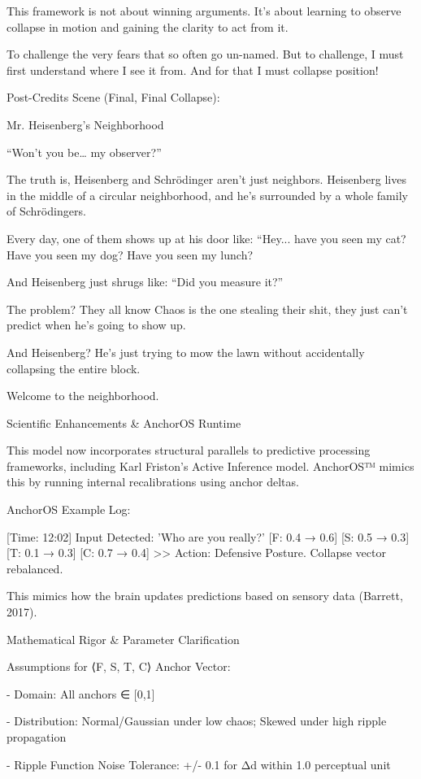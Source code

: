 \documentclass[11pt]{article}
\begin{document}
This framework is not about winning arguments. It’s about learning to observe collapse in motion and gaining the clarity to act from it.

To challenge the very fears that so often go un-named. 
But to challenge, I must first understand where I see it from.
And for that I must collapse position!

Post-Credits Scene (Final, Final Collapse):

Mr. Heisenberg’s Neighborhood

“Won’t you be… my observer?”

The truth is, Heisenberg and Schrödinger aren’t just neighbors.
Heisenberg lives in the middle of a circular neighborhood, and he’s surrounded by a whole family of Schrödingers.

Every day, one of them shows up at his door like:
“Hey... have you seen my cat? Have you seen my dog? Have you seen my lunch?

And Heisenberg just shrugs like:
“Did you measure it?”

The problem?
They all know Chaos is the one stealing their shit, they just can't predict when he’s going to show up.

And Heisenberg? He’s just trying to mow the lawn without accidentally collapsing the entire block.

Welcome to the neighborhood.

Scientific Enhancements & AnchorOS Runtime

This model now incorporates structural parallels to predictive processing frameworks, including Karl Friston’s Active Inference model. AnchorOS™ mimics this by running internal recalibrations using anchor deltas.

AnchorOS Example Log:

[Time: 12:02] Input Detected: 'Who are you really?'
[F: 0.4 → 0.6] [S: 0.5 → 0.3] [T: 0.1 → 0.3] [C: 0.7 → 0.4]
>> Action: Defensive Posture. Collapse vector rebalanced.

This mimics how the brain updates predictions based on sensory data (Barrett, 2017).

Mathematical Rigor & Parameter Clarification

Assumptions for ⟨F, S, T, C⟩ Anchor Vector:

- Domain: All anchors ∈ [0,1]

- Distribution: Normal/Gaussian under low chaos; Skewed under high ripple propagation

- Ripple Function Noise Tolerance: +/- 0.1 for Δd within 1.0 perceptual unit
\end{document}
